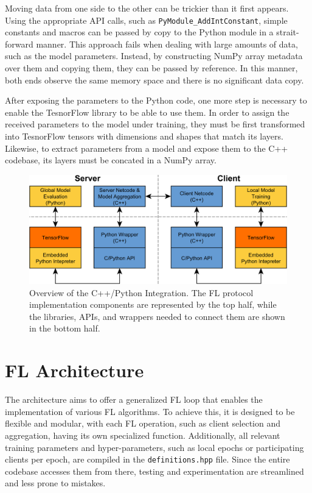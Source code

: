 Moving data from one side to the other can be trickier than it first appears. Using the appropriate API calls, such as \texttt{PyModule\_AddIntConstant}, simple constants and macros can be passed by copy to the Python module in a strait-forward manner. This approach fails when dealing with large amounts of data, such as the model parameters. Instead, by constructing NumPy array metadata over them and copying them, they can be passed by reference. In this manner, both ends observe the same memory space and there is no significant data copy.

After exposing the parameters to the Python code, one more step is necessary to enable the TesnorFlow library to be able to use them. In order to assign the received parameters to the model under training, they must be first transformed into TesnorFlow tensors with dimensions and shapes that match its layers. Likewise, to extract parameters from a model and expose them to the C++ codebase, its layers must be concated in a NumPy array.


\begin{figure}[H]
    \centering
        \includegraphics[width=1\textwidth]{Images/block_diagrams/model_lifecycle.png}
        \decoRule
        \caption[C++/Python Integration]{Overview of the C++/Python Integration. The FL protocol implementation components are represented by the top half, while the libraries, APIs, and wrappers needed to connect them are shown in the bottom half.}
        \label{fig:model_lifecycle}
\end{figure}

\section{FL Architecture}
The architecture aims to offer a generalized FL loop that enables the implementation of various FL algorithms. To achieve this, it is designed to be flexible and modular, with each FL operation, such as client selection and aggregation, having its own specialized function. Additionally, all relevant training parameters and hyper-parameters, such as local epochs or participating clients per epoch, are compiled in the \texttt{definitions.hpp} file. Since the entire codebase accesses them from there, testing and experimentation are streamlined and less prone to mistakes.

